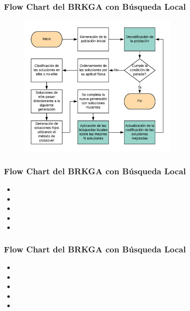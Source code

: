 \documentclass{beamer}
\begin{document}
\begin{frame}
\frametitle{Flow Chart del BRKGA con Búsqueda Local}

\begin{figure}[h]
	\centering
	\includegraphics[width=8cm]{BRKGA_Flow_Chart_Implementado}
	\label{fig:BRKGA_Flow_Chart_Implementado}
\end{figure}

\end{frame}


\begin{frame}
\frametitle{Flow Chart del BRKGA con Búsqueda Local}

\begin{itemize}
    \item 
    \pause
    \item 
    \pause
    \item 
    \pause
    \item 
    \pause
    \item 
    \pause
\end{itemize}

\end{frame}


\begin{frame}
\frametitle{Flow Chart del BRKGA con Búsqueda Local}

\begin{itemize}
    \item 
    \pause
    \item 
    \pause
    \item 
    \pause
    \item 
    \pause
    \item 
    \pause
\end{itemize}

\end{frame}
\end{document}
